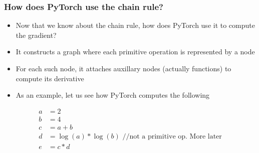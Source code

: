 \documentclass{beamer}
\theoremstyle{plain} %
\theoremstyle{example} %
\begin{document}
\begin{frame}
    \frametitle{How does PyTorch use the chain rule?}
    \begin{itemize}
        \item  Now that we know about the chain rule, how does PyTorch use it to compute the gradient?
        \item It constructs a graph where each primitive operation is represented by a node
        \item For each such node, it attaches auxillary nodes (actually functions) to compute its derivative
        \item As an example, let us see how PyTorch computes the following
    \end{itemize}
   
\begin{align*}
    a&=2\\
    b&=4\\
    c&=a+b\\
    d&=\log(a)*\log(b) \text{  //not a primitive op. More later}\\
    e&=c*d
\end{align*}    

\end{frame}
\end{document}
